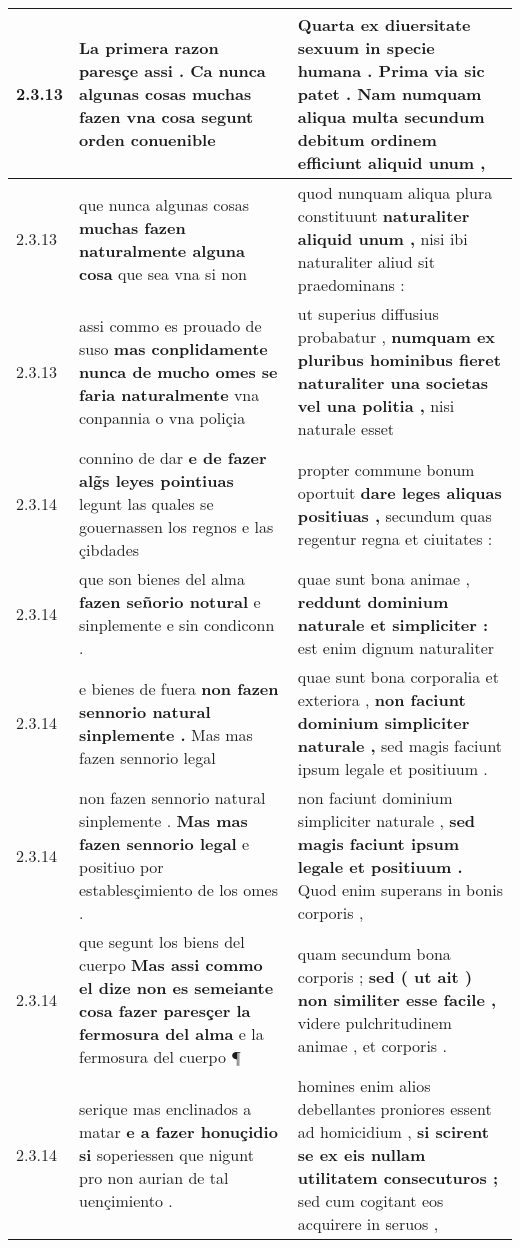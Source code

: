 \begin{tabular}{|p{1cm}|p{6.5cm}|p{6.5cm}|}
2.3.13 & La primera razon paresçe assi . \textbf{ Ca nunca algunas cosas muchas fazen vna cosa } segunt orden conuenible & Quarta ex diuersitate sexuum in specie humana . Prima via sic patet . \textbf{ Nam numquam aliqua multa } secundum debitum ordinem efficiunt aliquid unum , \\\hline
2.3.13 & que nunca algunas cosas \textbf{ muchas fazen naturalmente alguna cosa } que sea vna si non & quod nunquam aliqua plura constituunt \textbf{ naturaliter aliquid unum , } nisi ibi naturaliter aliud sit praedominans : \\\hline
2.3.13 & assi commo es prouado de suso \textbf{ mas conplidamente nunca de mucho omes se faria naturalmente } vna conpannia o vna poliçia & ut superius diffusius probabatur , \textbf{ numquam ex pluribus hominibus fieret naturaliter una societas vel una politia , } nisi naturale esset \\\hline
2.3.14 & connino de dar \textbf{ e de fazer alg̃s leyes pointiuas } legunt las quales se gouernassen los regnos e las çibdades & propter commune bonum oportuit \textbf{ dare leges aliquas positiuas , } secundum quas regentur regna et ciuitates : \\\hline
2.3.14 & que son bienes del alma \textbf{ fazen señorio notural } e sinplemente e sin condiconn . & quae sunt bona animae , \textbf{ reddunt dominium naturale et simpliciter : } est enim dignum naturaliter \\\hline
2.3.14 & e bienes de fuera \textbf{ non fazen sennorio natural sinplemente . } Mas mas fazen sennorio legal & quae sunt bona corporalia et exteriora , \textbf{ non faciunt dominium simpliciter naturale , } sed magis faciunt ipsum legale et positiuum . \\\hline
2.3.14 & non fazen sennorio natural sinplemente . \textbf{ Mas mas fazen sennorio legal } e positiuo por establesçimiento de los omes . & non faciunt dominium simpliciter naturale , \textbf{ sed magis faciunt ipsum legale et positiuum . } Quod enim superans in bonis corporis , \\\hline
2.3.14 & que segunt los biens del cuerpo \textbf{ Mas assi commo el dize non es semeiante cosa fazer paresçer la fermosura del alma } e la fermosura del cuerpo ¶ & quam secundum bona corporis ; \textbf{ sed ( ut ait ) non similiter esse facile , } videre pulchritudinem animae , et corporis . \\\hline
2.3.14 & serique mas enclinados a matar \textbf{ e a fazer honuçidio si } soperiessen que nigunt pro non aurian de tal uençimiento . & homines enim alios debellantes proniores essent ad homicidium , \textbf{ si scirent se ex eis nullam utilitatem consecuturos ; } sed cum cogitant eos acquirere in seruos , \\\hline

\end{tabular}
